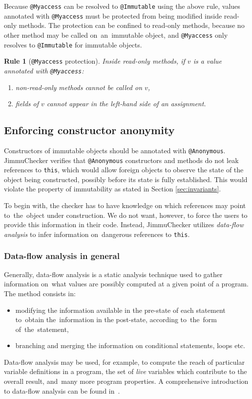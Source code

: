\documentclass{pracamgr}
\theoremstyle{break}
\theoremstyle{break}
\theoremstyle{break}
\newtheorem{verrule}{Rule}
\begin{document}
Because \texttt{@Myaccess} can be resolved to \texttt{@Immutable}
using the above rule, values annotated with \texttt{@Myaccess} must be
protected from being modified inside read-only methods. The protection
can be confined to read-only methods, because no other method may be
called on~an~immutable object, and \texttt{@Myaccess} only resolves to
\texttt{@Immutable} for immutable objects.

\begin{verrule}[\texttt{@Myaccess} protection]
  Inside read-only methods, if $v$ is a value annotated with
  \texttt{@Myaccess}:
  \begin{enumerate}
  \item non-read-only methods cannot be called on $v$, 
  \item fields of $v$ cannot appear in the left-hand side of an
    assignment.
  \end{enumerate}
\end{verrule}

\subsection{Enforcing constructor anonymity}
\label{sec:chk:anon}

Constructors of immutable objects should be annotated with
\texttt{@Anonymous}. JimmuChecker verifies that \texttt{@Anonymous}
constructors and methods do not leak references to \texttt{this},
which would allow foreign objects to observe the state of the object
being constructed, possibly before its state is fully
established. This would violate the property of immutability as stated
in Section \ref{sec:invariants}. 

To begin with, the checker has to have knowledge on which references
may point to~the~object under construction. We do not want, however,
to force the users to provide this information in their code. Instead,
JimmuChecker utilizes \emph{data-flow analysis} to infer information
on~dangerous references to \texttt{this}.

\subsubsection{Data-flow analysis in general} 

Generally, data-flow analysis is a static analysis technique used to
gather information on~what va\-lu\-es are possibly computed at a given
point of a program. The method consists in:
\begin{itemize}
\item modifying the information available in the pre-state of each
  statement to~obtain the~information in the post-state, according
  to~the~form of~the~statement, 
\item branching and merging the information on conditional statements,
  loops etc.
\end{itemize}
Data-flow analysis may be used, for example, to compute the reach of
particular variable definitions in a program, the set of \emph{live}
variables which contribute to the overall result, and~many more
program properties. A comprehensive introduction to data-flow analysis
can be found in~\cite{dataflow}. 
\end{document}
